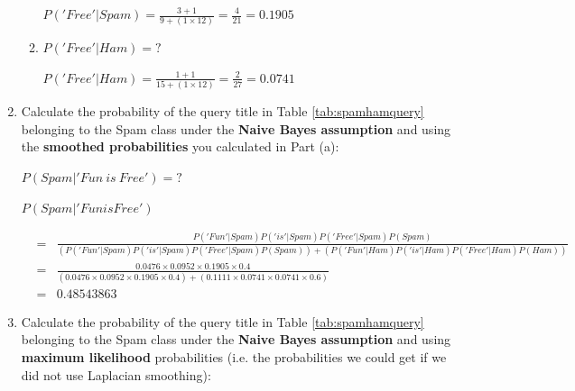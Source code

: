 \documentclass[solution]{ditpaper}
\begin{document}
\begin{enumerate}
\begin{enumerate}
					\begin{answer}
						$P('Free'|Spam) = \frac{3+1}{9 + (1 \times 12)} = \frac{4}{21} = 0.1905$
					\end{answer}
				\item $P('Free'|Ham)=?$
					\begin{answer}
						$P('Free'|Ham) = \frac{1+1}{15 + (1 \times 12)} = \frac{2}{27} = 0.0741$
					\end{answer}
			\end{enumerate}
		\item Calculate the probability of the query title in Table \ref{tab:spamhamquery} belonging to the Spam class under the \textbf{Naive Bayes assumption} and using the \textbf{smoothed probabilities} you calculated in Part (a):		
			\begin{center}
				$P(Spam|'Fun~is~Free')=?$
			\end{center}
			\begin{answer}
				$P(Spam|'Fun is Free')$ 
				\begin{scriptsize}
				\begin{eqnarray*}
					&=& \frac{P('Fun'|Spam)P('is'|Spam)P('Free'|Spam)P(Spam)}{(P('Fun'|Spam)P('is'|Spam)P('Free'|Spam)P(Spam))+(P('Fun'|Ham)P('is'|Ham)P('Free'|Ham)P(Ham))}\\
					&=& \frac{0.0476 \times 0.0952 \times 0.1905 \times 0.4}{(0.0476 \times 0.0952 \times 0.1905 \times 0.4) + (0.1111 \times 0.0741 \times  0.0741 \times 0.6)}\\
					&=& 0.48543863
				\end{eqnarray*}
				\end{scriptsize}
			\end{answer}
		\item Calculate the probability of the query title in Table \ref{tab:spamhamquery} belonging to the Spam class under the \textbf{Naive Bayes assumption} and using \textbf{maximum likelihood} probabilities (i.e. the probabilities we could get if we did not use Laplacian smoothing):	

\end{enumerate}
\end{document}
